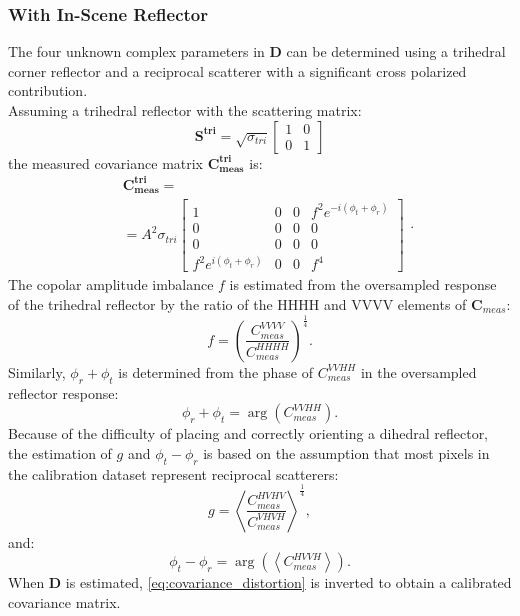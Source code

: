 \subsubsection{With In-Scene Reflector}
The four unknown complex parameters in $\mathbf{D}$ can be determined using a trihedral corner reflector and a reciprocal scatterer with a significant cross polarized contribution\cite{Sarabandi1989,Pipia2009}.\\
Assuming a trihedral reflector with the scattering matrix:
\begin{equation}
 \mathbf{S^{tri}} = \sqrt{\sigma_{tri}}
 \begin{bmatrix}1 & 0\\ 0 & 1\end{bmatrix}
\end{equation}
the measured covariance matrix $\mathbf{C_{meas}^{tri}}$ is:
\begin{equation}
	\begin{aligned}
	&\mathbf{C_{meas}^{tri}} =\\
	&= A^2 \sigma_{tri}
	\begin{bmatrix}
		1 & 0 & 0 & f^2 e^{-i \left(\phi_t + \phi_r\right)}\\
		0 & 0 & 0 & 0\\
		0 & 0 & 0 & 0\\
		f^2 e^{i \left(\phi_t + \phi_r\right)} & 0 & 0 & f^4
	\end{bmatrix}
	\end{aligned}.
\end{equation}
The copolar amplitude imbalance $f$ is estimated from the oversampled response of the trihedral reflector by the ratio of the HHHH and VVVV elements of $\mathbf{C}_{meas}$:
\begin{equation}
	f = \left(\frac{C_{meas}^{VVVV}}{C_{meas}^{HHHH}}\right)^{\frac{1}{4}}.
\end{equation}
Similarly, $\phi_r + \phi_t$ is determined from the phase of $C_{meas}^{VVHH}$ in the oversampled reflector response:
\begin{equation}
	\phi_r + \phi_t = \operatorname{arg}\left(C_{meas}^{VVHH}\right).
\end{equation}
Because of the difficulty of placing and correctly orienting a dihedral reflector, the estimation of $g$ and $\phi_t - \phi_r$ is based on the assumption that most pixels in the calibration dataset represent reciprocal scatterers:
\begin{equation}
	g = \left<\frac{C_{meas}^{HVHV}}{C_{meas}^{VHVH}}\right>^\frac{1}{4},
\end{equation}
and:
\begin{equation}
	\phi_t - \phi_r =\operatorname{arg}\left( \left<C_{meas}^{HVVH}\right>\right).
\end{equation}
When $\mathbf{D}$ is estimated, \autoref{eq:covariance_distortion} is inverted to obtain a calibrated covariance matrix.\\
